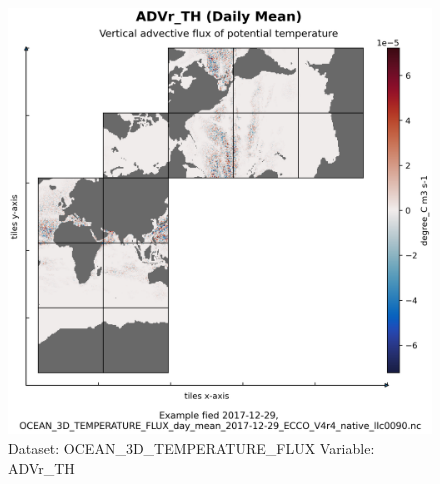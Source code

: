 \begin{figure}[H]
\centering
\includegraphics[scale=0.55]{../images/plots/native_plots/Ocean_Three-Dimensional_Potential_Temperature_Fluxes/ADVr_TH.png}
\caption{Dataset: OCEAN\_3D\_TEMPERATURE\_FLUX Variable: ADVr\_TH}
\label{tab:table-OCEAN_3D_TEMPERATURE_FLUX_ADVr_TH-Plot}
\end{figure}
\pagebreak
